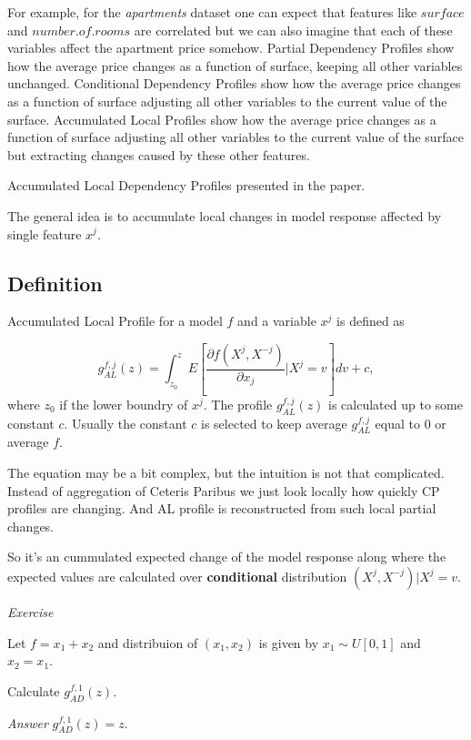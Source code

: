 \documentclass[12pt,]{krantz}
\begin{document}
For example, for the \emph{apartments} dataset one can expect that features like \(surface\) and \(number.of.rooms\) are correlated but we can also imagine that each of these variables affect the apartment price somehow. Partial Dependency Profiles show how the average price changes as a function of surface, keeping all other variables unchanged. Conditional Dependency Profiles show how the average price changes as a function of surface adjusting all other variables to the current value of the surface. Accumulated Local Profiles show how the average price changes as a function of surface adjusting all other variables to the current value of the surface but extracting changes caused by these other features.

Accumulated Local Dependency Profiles presented in the \citep{R-ALEPlot} paper.

The general idea is to accumulate local changes in model response affected by single feature \(x^j\).

\hypertarget{definition-2}{%
\subsection{Definition}\label{definition-2}}

Accumulated Local Profile for a model \(f\) and a variable \(x^j\) is defined as

\[
g_{AL}^{f, j}(z) = \int_{z_0}^z E\left[\frac{\partial f(X^j, X^{-j})}{\partial x_j}|X^j = v\right] dv + c,
\]
where \(z_0\) if the lower boundry of \(x^j\). The profile \(g_{AL}^{f, j}(z)\) is calculated up to some constant \(c\). Usually the constant \(c\) is selected to keep average \(g_{AL}^{f, j}\) equal to 0 or average \(f\).

The equation may be a bit complex, but the intuition is not that complicated. Instead of aggregation of Ceteris Paribus we just look locally how quickly CP profiles are changing. And AL profile is reconstructed from such local partial changes.

So it's an cummulated expected change of the model response along where the expected values are calculated over \textbf{conditional} distribution \((X^j,X^{-j})|X^j=v\).

\emph{Exercise}

Let \(f = x_1 + x_2\) and distribuion of \((x_1, x_2)\) is given by \(x_1 \sim U[0,1]\) and \(x_2=x_1\).

Calculate \(g_{AD}^{f, 1}(z)\).

\emph{Answer} \(g_{AD}^{f, 1}(z) = z\).
\end{document}
